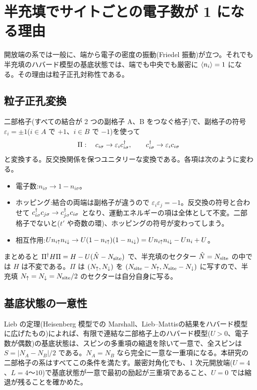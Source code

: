 \chapter{半充填でサイトごとの電子数が 1 になる理由}
\label{app:ph}

開放端の系では一般に、端から電子の密度の振動(Friedel 振動)が立つ。それでも半充填のハバード模型の基底状態では、端でも中央でも厳密に $\langle n_i\rangle=1$ になる。その理由は粒子正孔対称性である。

\section{粒子正孔変換}
二部格子(すべての結合が 2 つの副格子 A、B をつなぐ格子)で、副格子の符号 $\varepsilon_i=\pm1$($i\in A$ で $+1$、$i\in B$ で $-1$)を使って
\begin{equation}
  \Pi:\quad c_{i\sigma}\to\varepsilon_ic^\dagger_{i\sigma},\qquad c^\dagger_{i\sigma}\to\varepsilon_ic_{i\sigma}
\end{equation}
と変換する。反交換関係を保つユニタリーな変換である。各項は次のように変わる。
\begin{itemize}
  \item 電子数:$n_{i\sigma}\to1-n_{i\sigma}$。
  \item ホッピング:結合の両端は副格子が違うので $\varepsilon_i\varepsilon_j=-1$。反交換の符号と合わせて $c^\dagger_{i\sigma}c_{j\sigma}\to c^\dagger_{j\sigma}c_{i\sigma}$ となり、運動エネルギーの項は全体として不変。二部格子でないと($t'$ や奇数の環)、ホッピングの符号が変わってしまう。
  \item 相互作用:$Un_{i\uparrow}n_{i\downarrow}\to U(1-n_{i\uparrow})(1-n_{i\downarrow})=Un_{i\uparrow}n_{i\downarrow}-Un_i+U$。
\end{itemize}
まとめると $\Pi^\dagger H\Pi=H-U(\hat N-N_{\rm site})$ で、半充填のセクター $\hat N=N_{\rm site}$ の中では $H$ は不変である。$\Pi$ は $(N_\uparrow,N_\downarrow)$ を $(N_{\rm site}-N_\uparrow,N_{\rm site}-N_\downarrow)$ に写すので、半充填 $N_\uparrow=N_\downarrow=N_{\rm site}/2$ のセクターは自分自身に写る。

\section{基底状態の一意性}
Lieb の定理\cite{lieb1989}(Heisenberg 模型での Marshall\cite{marshall1955}、Lieb--Mattis\cite{liebmattis1962}の結果をハバード模型に広げたもの)によれば、有限で連結な二部格子上のハバード模型($U>0$、電子数が偶数)の基底状態は、スピンの多重項の縮退を除いて一意で、全スピンは $S=\lvert N_A-N_B\rvert/2$ である。$N_A=N_B$ なら完全に一意な一重項になる。本研究の二部格子の系はすべてこの条件を満たす。厳密対角化でも、1 次元開放端($U=4$、$L=4$〜$10$)で基底状態が一意で最初の励起が三重項であること、$U=0$ では縮退が残ることを確かめた。

